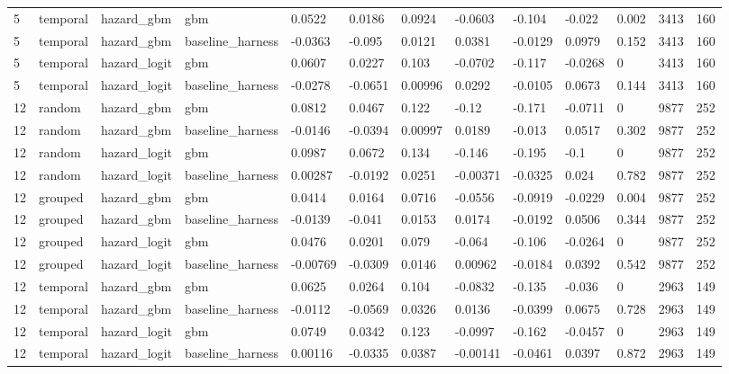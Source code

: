 \begin{tabular}{lllllllllllll}
5 & temporal & hazard\_gbm & gbm & 0.0522 & 0.0186 & 0.0924 & -0.0603 & -0.104 & -0.022 & 0.002 & 3413 & 160 \\
5 & temporal & hazard\_gbm & baseline\_harness & -0.0363 & -0.095 & 0.0121 & 0.0381 & -0.0129 & 0.0979 & 0.152 & 3413 & 160 \\
5 & temporal & hazard\_logit & gbm & 0.0607 & 0.0227 & 0.103 & -0.0702 & -0.117 & -0.0268 & 0 & 3413 & 160 \\
5 & temporal & hazard\_logit & baseline\_harness & -0.0278 & -0.0651 & 0.00996 & 0.0292 & -0.0105 & 0.0673 & 0.144 & 3413 & 160 \\
12 & random & hazard\_gbm & gbm & 0.0812 & 0.0467 & 0.122 & -0.12 & -0.171 & -0.0711 & 0 & 9877 & 252 \\
12 & random & hazard\_gbm & baseline\_harness & -0.0146 & -0.0394 & 0.00997 & 0.0189 & -0.013 & 0.0517 & 0.302 & 9877 & 252 \\
12 & random & hazard\_logit & gbm & 0.0987 & 0.0672 & 0.134 & -0.146 & -0.195 & -0.1 & 0 & 9877 & 252 \\
12 & random & hazard\_logit & baseline\_harness & 0.00287 & -0.0192 & 0.0251 & -0.00371 & -0.0325 & 0.024 & 0.782 & 9877 & 252 \\
12 & grouped & hazard\_gbm & gbm & 0.0414 & 0.0164 & 0.0716 & -0.0556 & -0.0919 & -0.0229 & 0.004 & 9877 & 252 \\
12 & grouped & hazard\_gbm & baseline\_harness & -0.0139 & -0.041 & 0.0153 & 0.0174 & -0.0192 & 0.0506 & 0.344 & 9877 & 252 \\
12 & grouped & hazard\_logit & gbm & 0.0476 & 0.0201 & 0.079 & -0.064 & -0.106 & -0.0264 & 0 & 9877 & 252 \\
12 & grouped & hazard\_logit & baseline\_harness & -0.00769 & -0.0309 & 0.0146 & 0.00962 & -0.0184 & 0.0392 & 0.542 & 9877 & 252 \\
12 & temporal & hazard\_gbm & gbm & 0.0625 & 0.0264 & 0.104 & -0.0832 & -0.135 & -0.036 & 0 & 2963 & 149 \\
12 & temporal & hazard\_gbm & baseline\_harness & -0.0112 & -0.0569 & 0.0326 & 0.0136 & -0.0399 & 0.0675 & 0.728 & 2963 & 149 \\
12 & temporal & hazard\_logit & gbm & 0.0749 & 0.0342 & 0.123 & -0.0997 & -0.162 & -0.0457 & 0 & 2963 & 149 \\
12 & temporal & hazard\_logit & baseline\_harness & 0.00116 & -0.0335 & 0.0387 & -0.00141 & -0.0461 & 0.0397 & 0.872 & 2963 & 149 \\
\bottomrule
\end{tabular}